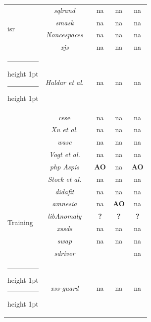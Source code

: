 \documentclass[conference]{IEEEtran}
\makeatletter
\newcommand{\tick}{\ding{52}}
\newcommand{\thickhline}{%
    \noalign {\ifnum 0=`}\fi \hrule height 1pt
    \futurelet \reserved@a \@xhline
}
\makeatother
\begin{document}
\begin{table}
\begin{threeparttable}
\begin{small}
{\begin{tabular}{l|c|ccc}
  \hline
  \multirow{4}{*}{{\sc isr}}
  &   {\it {\sc sql}rand}~\cite{BK04} & {\sc na} & {\sc na} & {\sc na} \\
  &   {\it {\sc sm}ask}~\cite{JB07} & {\sc na} & {\sc na} & {\sc na} \\
  &   {\it Noncespaces}~\cite{GC09} & {\sc na} & {\sc na} & {\sc na} \\
  &   {\it x{\sc js}}~\cite{APKLM10} & {\sc na} & {\sc na} & {\sc na} \\
  \thickhline
  \thickhline
  \multirow{7}{*}{Taint Tracking}
  &   {\it Haldar et al.}~\cite{HCF05}  & {\sc na} & {\sc na} & {\sc na} \\
  &   {\sc csse}~\cite{PB05} & {\sc na} & {\sc na} & {\sc na} \\
  &   {\it Xu et al.}~\cite{XBS06}  & {\sc na} & {\sc na} & {\sc na} \\
  &   {\it {\sc wasc}}~\cite{NLC07} & {\sc na} & {\sc na} & {\sc na} \\
  &   {\it Vogt et al.}~\cite{VFJKKV07}  & {\sc na} & {\sc na} & {\sc na} \\
  &   {\it {\sc php} Aspis}~\cite{PMP11} & {\bf AO} & {\sc na} & {\bf AO} \\
  &   {\it Stock et al.}~\cite{SLMS14} & {\sc na} & {\sc na} & {\sc na} \\
  \hline
  \multirow{6}{*}{Training}
  &   {\it {\sc didafit}}~\cite{LLW02} & {\sc na} & {\sc na} & {\sc na} \\
  &   {\it {\sc amnesia}}~\cite{HO05,HO06,HO05b} & {\sc na} & {\bf AO} & {\sc na} \\
  &   {\it libAnomaly}~\cite{VMV05} & {\bf ?} & {\bf ?} & {\bf ?} \\
  &   {\it {\sc xssds}}~\cite{JEP08} & {\sc na} & {\sc na} & {\sc na} \\
  &   {\it {\sc swap}}~\cite{WPLKK09} & {\sc na} & {\sc na} & {\sc na} \\
  &   {\it {\sc sd}river}~\cite{MS09,MKS09,MKLS11} & \tick & \tick & {\sc na} \\
  \thickhline
  \thickhline
  \multirow{3}{*}{Hybrid}
  &   {\it {\sc xss-guard}}~\cite{BV08} & {\sc na} & {\sc na} & {\sc na} \\

\end{tabular}}
\end{small}
\end{threeparttable}
\end{table}
\end{document}
